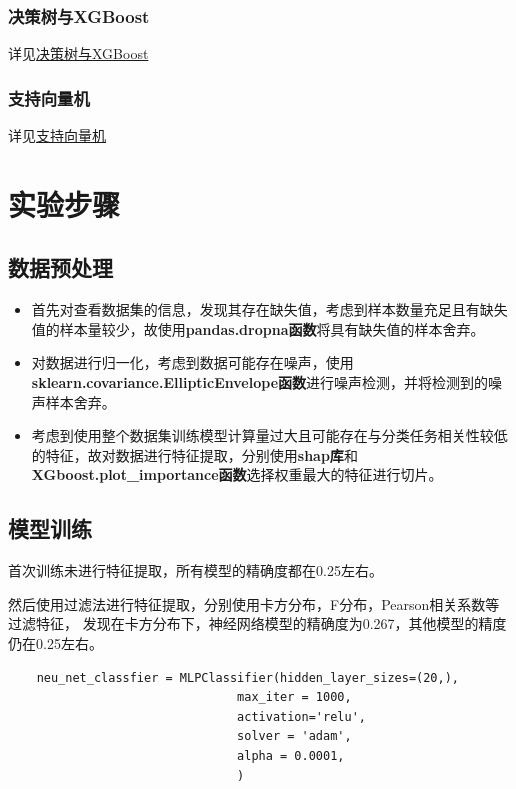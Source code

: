 \documentclass[12pt, a4paper, oneside]{ctexart}
\begin{document}
\subsubsection{决策树与XGBoost}
详见\href{https://github.com/xiaoma-ustc/2022-USTC-Introduction-to-Machine-Learning/blob/main/lab/lab3/report/report.pdf}{决策树与XGBoost}
\subsubsection{支持向量机}
详见\href{https://github.com/xiaoma-ustc/2022-USTC-Introduction-to-Machine-Learning/blob/main/lab/lab2/report/Report.pdf}{支持向量机}
\section{实验步骤}
\subsection{数据预处理}
\begin{itemize}
    \item 首先对查看数据集的信息，发现其存在缺失值，考虑到样本数量充足且有缺失值的样本量较少，故使用\textbf{pandas.dropna函数}将具有缺失值的样本舍弃。
    \item 对数据进行归一化，考虑到数据可能存在噪声，使用\textbf{sklearn.covariance.EllipticEnvelope函数}进行噪声检测，并将检测到的噪声样本舍弃。
    \item 考虑到使用整个数据集训练模型计算量过大且可能存在与分类任务相关性较低的特征，故对数据进行特征提取，分别使用\textbf{shap库}和\textbf{XGboost.plot\_importance函数}选择权重最大的特征进行切片。
\end{itemize}
\subsection{模型训练}
首次训练未进行特征提取，所有模型的精确度都在0.25左右。

然后使用过滤法进行特征提取，分别使用卡方分布，F分布，Pearson相关系数等过滤特征，
发现在卡方分布下，神经网络模型的精确度为0.267，其他模型的精度仍在0.25左右。

\begin{lstlisting}
    neu_net_classfier = MLPClassifier(hidden_layer_sizes=(20,),
                                max_iter = 1000,
                                activation='relu',
                                solver = 'adam',
                                alpha = 0.0001,
                                )
\end{lstlisting}
\end{document}

